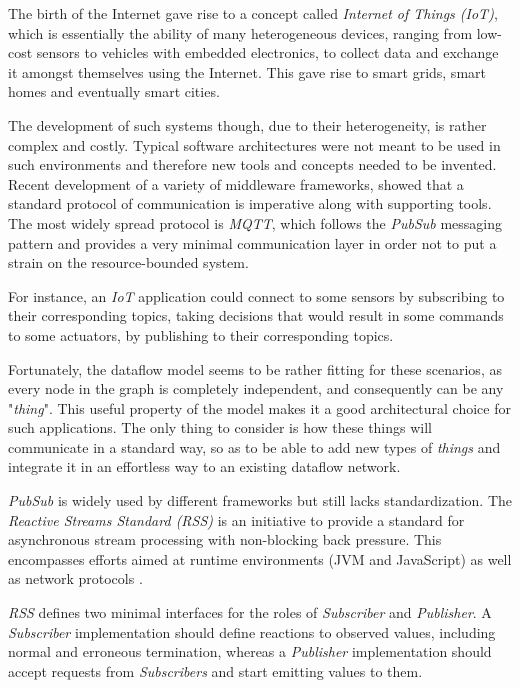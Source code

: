 \documentclass{dithesis}
\begin{document}

The birth of the Internet gave rise to a concept called \textit{Internet of Things (IoT)}, which is essentially the ability of many heterogeneous devices, ranging from low-cost sensors to vehicles with embedded electronics, to collect data and exchange it amongst themselves using the Internet. This gave rise to smart grids, smart homes and eventually smart cities. 

The development of such systems though, due to their heterogeneity, is rather complex and costly. Typical software architectures were not meant to be used in such environments and therefore new tools and concepts needed to be invented. Recent development of a variety of middleware frameworks, showed that a standard protocol of communication is imperative along with supporting tools\cite{iot_middleware}. The most widely spread protocol is \textit{MQTT}, which follows the \textit{PubSub} messaging pattern and provides a very minimal communication layer in order not to put a strain on the resource-bounded system\cite{mqtt}. 

For instance, an \textit{IoT} application could connect to some sensors by subscribing to their corresponding topics, taking decisions that would result in some commands to some actuators, by publishing to their corresponding topics.

Fortunately, the dataflow model seems to be rather fitting for these scenarios\cite{iot_dataflow}, as every node in the graph is completely independent, and consequently can be any "\textit{thing}". This useful property of the model makes it a good architectural choice for such applications. The only thing to consider is how these things will communicate in a standard way, so as to be able to add new types of \textit{things} and integrate it in an effortless way to an existing dataflow network.


\textit{PubSub} is widely used by different frameworks but still lacks standardization. The \textit{Reactive Streams Standard (RSS)} is an initiative to provide a standard for asynchronous stream processing with non-blocking back pressure. This encompasses efforts aimed at runtime environments (JVM and JavaScript) as well as network protocols \cite{rss}.

\textit{RSS} defines two minimal interfaces for the roles of \textit{Subscriber} and \textit{Publisher}. A \textit{Subscriber} implementation should define reactions to observed values, including normal and erroneous termination, whereas a \textit{Publisher} implementation should accept requests from \textit{Subscribers} and start emitting values to them.
\end{document}
